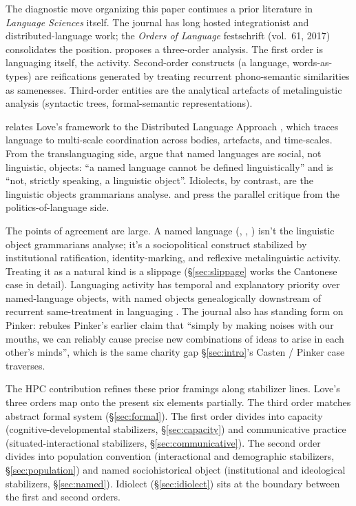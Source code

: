 \documentclass[12pt]{article}
\begin{document}
The diagnostic move organizing this paper continues a prior literature in \textit{Language Sciences} itself. The journal has long hosted integrationist and distributed-language work; the \textit{Orders of Language} festschrift (vol.~61, 2017) consolidates the position. \textcite{love2017} proposes a three-order analysis. The first order is languaging itself, the activity. Second-order constructs (a language, words-as-types) are reifications generated by treating recurrent phono-semantic similarities as samenesses. Third-order entities are the analytical artefacts of metalinguistic analysis (syntactic trees, formal-semantic representations).

\textcite{cowley2017} relates Love's framework to the Distributed Language Approach \citep{cowley2011}, which traces language to multi-scale coordination across bodies, artefacts, and time-scales. From the translanguaging side, \textcite{otheguyGarciaReid2015} argue that named languages are social, not linguistic, objects: \enquote{a named language cannot be defined linguistically} and is \enquote{not, strictly speaking, a linguistic object}. Idiolects, by contrast, are the linguistic objects grammarians analyse. \textcite{makoniPennycook2006} and \textcite{pennycook2010} press the parallel critique from the politics-of-language side.

The points of agreement are large. A named language (, , ) isn't the linguistic object grammarians analyse; it's a sociopolitical construct stabilized by institutional ratification, identity-marking, and reflexive metalinguistic activity. Treating it as a natural kind is a slippage (§\ref{sec:slippage} works the Cantonese case in detail). Languaging activity has temporal and explanatory priority over named-language objects, with named objects genealogically downstream of recurrent same-treatment in languaging \citep{love2017}. The journal also has standing form on Pinker: \textcite[fn~14]{love2017} rebukes Pinker's earlier claim that \enquote{simply by making noises with our mouths, we can reliably cause precise new combinations of ideas to arise in each other's minds}, which is the same charity gap §\ref{sec:intro}'s Casten / Pinker case traverses.

The HPC contribution refines these prior framings along stabilizer lines. Love's three orders map onto the present six elements partially. The third order matches abstract formal system (§\ref{sec:formal}). The first order divides into capacity (cognitive-developmental stabilizers, §\ref{sec:capacity}) and communicative practice (situated-interactional stabilizers, §\ref{sec:communicative}). The second order divides into population convention (interactional and demographic stabilizers, §\ref{sec:population}) and named sociohistorical object (institutional and ideological stabilizers, §\ref{sec:named}). Idiolect (§\ref{sec:idiolect}) sits at the boundary between the first and second orders.
\end{document}
